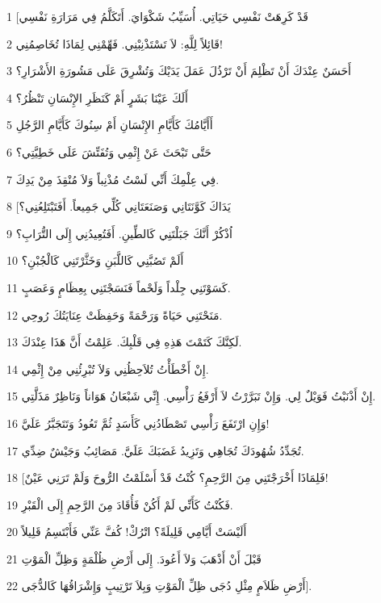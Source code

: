 \par 1 [قَدْ كَرِهَتْ نَفْسِي حَيَاتِي. أُسَيِّبُ شَكْوَايَ. أَتَكَلَّمُ فِي مَرَارَةِ نَفْسِي
\par 2 قَائِلاً لِلَّهِ: لاَ تَسْتَذْنِبْنِي. فَهِّمْنِي لِمَاذَا تُخَاصِمُنِي!
\par 3 أَحَسَنٌ عِنْدَكَ أَنْ تَظْلِمَ أَنْ تَرْذُلَ عَمَلَ يَدَيْكَ وَتُشْرِقَ عَلَى مَشُورَةِ الأَشْرَارِ؟
\par 4 أَلَكَ عَيْنَا بَشَرٍ أَمْ كَنَظَرِ الإِنْسَانِ تَنْظُرُ؟
\par 5 أَأَيَّامُكَ كَأَيَّامِ الإِنْسَانِ أَمْ سِنُوكَ كَأَيَّامِ الرَّجُلِ
\par 6 حَتَّى تَبْحَثَ عَنْ إِثْمِي وَتُفَتِّشَ عَلَى خَطِيَّتِي؟
\par 7 فِي عِلْمِكَ أَنِّي لَسْتُ مُذْنِباً وَلاَ مُنْقِذَ مِنْ يَدِكَ.
\par 8 [يَدَاكَ كَوَّنَتَانِي وَصَنَعَتَانِي كُلِّي جَمِيعاً. أَفَتَبْتَلِعُنِي؟
\par 9 اُذْكُرْ أَنَّكَ جَبَلْتَنِي كَالطِّينِ. أَفَتُعِيدُنِي إِلَى التُّرَابِ؟
\par 10 أَلَمْ تَصُبَّنِي كَاللَّبَنِ وَخَثَّرْتَنِي كَالْجُبْنِ؟
\par 11 كَسَوْتَنِي جِلْداً وَلَحْماً فَنَسَجْتَنِي بِعِظَامٍ وَعَصَبٍ.
\par 12 مَنَحْتَنِي حَيَاةً وَرَحْمَةً وَحَفِظَتْ عِنَايَتُكَ رُوحِي.
\par 13 لَكِنَّكَ كَتَمْتَ هَذِهِ فِي قَلْبِكَ. عَلِمْتُ أَنَّ هَذَا عِنْدَكَ.
\par 14 إِنْ أَخْطَأْتُ تُلاَحِظُنِي وَلاَ تُبْرِئُنِي مِنْ إِثْمِي.
\par 15 إِنْ أَذْنَبْتُ فَوَيْلٌ لِي. وَإِنْ تَبَرَّرْتُ لاَ أَرْفَعُ رَأْسِي. إِنِّي شَبْعَانُ هَوَاناً وَنَاظِرٌ مَذَلَّتِي.
\par 16 وَإِنِ ارْتَفَعَ رَأْسِي تَصْطَادُنِي كَأَسَدٍ ثُمَّ تَعُودُ وَتَتَجَبَّرُ عَلَيَّ!
\par 17 تُجَدِّدُ شُهُودَكَ تُجَاهِي وَتَزِيدُ غَضَبَكَ عَلَيَّ. مَصَائِبُ وَجَيْشٌ ضِدِّي.
\par 18 [فَلِمَاذَا أَخْرَجْتَنِي مِنَ الرَّحِمِ؟ كُنْتُ قَدْ أَسْلَمْتُ الرُّوحَ وَلَمْ تَرَنِي عَيْنٌ!
\par 19 فَكُنْتُ كَأَنِّي لَمْ أَكُنْ فَأُقَادَ مِنَ الرَّحِمِ إِلَى الْقَبْرِ.
\par 20 أَلَيْسَتْ أَيَّامِي قَلِيلَةً؟ اتْرُكْ! كُفَّ عَنِّي فَأَبْتَسِمُ قَلِيلاً
\par 21 قَبْلَ أَنْ أَذْهَبَ وَلاَ أَعُودَ. إِلَى أَرْضِ ظُلْمَةٍ وَظِلِّ الْمَوْتِ
\par 22 أَرْضِ ظَلاَمٍ مِثْلِ دُجَى ظِلِّ الْمَوْتِ وَبِلاَ تَرْتِيبٍ وَإِشْرَاقُهَا كَالدُّجَى].

